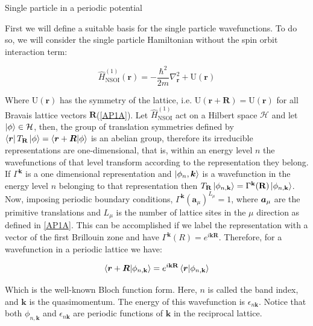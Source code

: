 \begin{section}{Single particle in a periodic potential}

First we will define a suitable basis for the single particle wavefunctions. To do so, we will consider the single particle Hamiltonian without the spin orbit interaction term:

\begin{equation}
\label{LaticeHam}
\hat{H}^{(1)}_{\text{NSOI}}(\textbf{r}) = -\frac{\hbar^2}{2m}\nabla^2_{\textbf{r}} + \text{U}(\textbf{r})
\end{equation}

Where $\text{U}(\textbf{r})$ has the symmetry of the lattice, i.e. $\text{U}(\textbf{r} + \textbf{R}) = \text{U}(\textbf{r})$ for all Bravais lattice vectors $\textbf{R}$(\ref{AP1A}). Let $\hat{H}^{(1)}_{\text{NSOI}}$ act on a Hilbert space $\mathcal{H}$ and let $\ket{\phi} \in \mathcal{H}$, then, the group of translation symmetries defined by $\bra{\boldsymbol{r}} T_{\textbf{R}} \ket{\phi} = \bra{\boldsymbol{r} + \boldsymbol{R}} \ket{\phi}$ is an abelian group, therefore its irreducible representations are one-dimensional, that is, within an energy level $n$ the wavefunctions of that level transform according to the representation they belong. If $\Gamma^{\textbf{k}}$ is a one dimensional representation and $\ket{\phi_n, \boldsymbol{k}}$ is a wavefunction in the energy level $n$ belonging to that representation then $T_{\textbf{R}}\ket{\phi_{n, \textbf{k}}} = \Gamma^{\textbf{k}}(\textbf{R}) \ket{\phi_{n, \textbf{k}}}$. Now, imposing periodic boundary conditions, $\Gamma^{\textbf{k}}(\textbf{a}_\mu)^{L_\mu} = 1$, where $\boldsymbol{a}_\mu$ are the primitive translations and $L_\mu$ is the number of lattice sites in the $\mu$ direction as defined in \ref{AP1A}. This can be accomplished if we label the representation with a vector of the first Brillouin zone and have $\Gamma^{\textbf{k}}(R) = e^{i \textbf{k} \textbf{R}}$. Therefore, for a wavefunction in a periodic lattice we have:

\begin{equation}
\label{Bloch1}
\bra{\boldsymbol{r}+\boldsymbol{R}} \ket{\phi_{n, \textbf{k}}} = e^{i\textbf{k}\textbf{R}}\bra{\boldsymbol{r}} \ket{\phi_{n, \textbf{k}}}
\end{equation}

Which is the well-known Bloch function form. Here, $n$ is called the band index, and $\textbf{k}$ is the quasimomentum. The energy of this wavefunction is $\epsilon_{n \textbf{k}}$.  Notice that both $\phi_{n,\textbf{k}}$ and $\epsilon_{n \textbf{k}}$ are periodic functions of $\textbf{k}$ in the reciprocal lattice.


\end{section}

